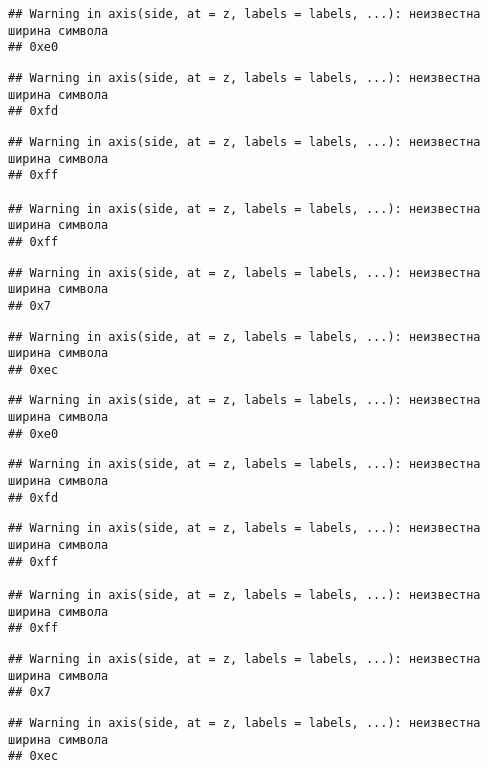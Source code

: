 \documentclass[
]{article}
\begin{document}
\begin{verbatim}
## Warning in axis(side, at = z, labels = labels, ...): неизвестна ширина символа
## 0xe0
\end{verbatim}

\begin{verbatim}
## Warning in axis(side, at = z, labels = labels, ...): неизвестна ширина символа
## 0xfd
\end{verbatim}

\begin{verbatim}
## Warning in axis(side, at = z, labels = labels, ...): неизвестна ширина символа
## 0xff

## Warning in axis(side, at = z, labels = labels, ...): неизвестна ширина символа
## 0xff
\end{verbatim}

\begin{verbatim}
## Warning in axis(side, at = z, labels = labels, ...): неизвестна ширина символа
## 0x7
\end{verbatim}

\begin{verbatim}
## Warning in axis(side, at = z, labels = labels, ...): неизвестна ширина символа
## 0xec
\end{verbatim}

\begin{verbatim}
## Warning in axis(side, at = z, labels = labels, ...): неизвестна ширина символа
## 0xe0
\end{verbatim}

\begin{verbatim}
## Warning in axis(side, at = z, labels = labels, ...): неизвестна ширина символа
## 0xfd
\end{verbatim}

\begin{verbatim}
## Warning in axis(side, at = z, labels = labels, ...): неизвестна ширина символа
## 0xff

## Warning in axis(side, at = z, labels = labels, ...): неизвестна ширина символа
## 0xff
\end{verbatim}

\begin{verbatim}
## Warning in axis(side, at = z, labels = labels, ...): неизвестна ширина символа
## 0x7
\end{verbatim}

\begin{verbatim}
## Warning in axis(side, at = z, labels = labels, ...): неизвестна ширина символа
## 0xec
\end{verbatim}
\end{document}
